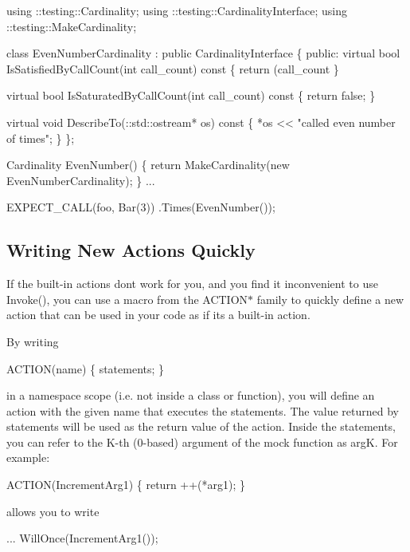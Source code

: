 \begin{DoxyCode}
using ::testing::Cardinality;
using ::testing::CardinalityInterface;
using ::testing::MakeCardinality;

\textcolor{keyword}{class }EvenNumberCardinality : \textcolor{keyword}{public} CardinalityInterface \{
 \textcolor{keyword}{public}:
  \textcolor{keyword}{virtual} \textcolor{keywordtype}{bool} IsSatisfiedByCallCount(\textcolor{keywordtype}{int} call\_count)\textcolor{keyword}{ const }\{
    \textcolor{keywordflow}{return} (call\_count %
  \}

  \textcolor{keyword}{virtual} \textcolor{keywordtype}{bool} IsSaturatedByCallCount(\textcolor{keywordtype}{int} call\_count)\textcolor{keyword}{ const }\{
    \textcolor{keywordflow}{return} \textcolor{keyword}{false};
  \}

  \textcolor{keyword}{virtual} \textcolor{keywordtype}{void} DescribeTo(::std::ostream* os)\textcolor{keyword}{ const }\{
    *os << \textcolor{stringliteral}{"called even number of times"};
  \}
\};

Cardinality EvenNumber() \{
  \textcolor{keywordflow}{return} MakeCardinality(\textcolor{keyword}{new} EvenNumberCardinality);
\}
...

  EXPECT\_CALL(foo, Bar(3))
      .Times(EvenNumber());
\end{DoxyCode}


\subsection*{Writing New Actions Quickly}

If the built-\/in actions don\textquotesingle{}t work for you, and you find it inconvenient to use {\ttfamily Invoke()}, you can use a macro from the {\ttfamily A\+C\+T\+I\+O\+N$\ast$} family to quickly define a new action that can be used in your code as if it\textquotesingle{}s a built-\/in action.

By writing 
\begin{DoxyCode}
ACTION(name) \{ statements; \}
\end{DoxyCode}
 in a namespace scope (i.\+e. not inside a class or function), you will define an action with the given name that executes the statements. The value returned by {\ttfamily statements} will be used as the return value of the action. Inside the statements, you can refer to the K-\/th (0-\/based) argument of the mock function as {\ttfamily argK}. For example\+: 
\begin{DoxyCode}
ACTION(IncrementArg1) \{ \textcolor{keywordflow}{return} ++(*arg1); \}
\end{DoxyCode}
 allows you to write 
\begin{DoxyCode}
... WillOnce(IncrementArg1());
\end{DoxyCode}



